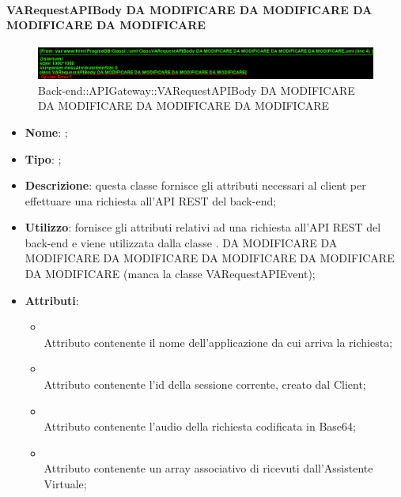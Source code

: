 \hypertarget{VARequestAPIBody DA MODIFICARE DA MODIFICARE DA MODIFICARE DA MODIFICARE_label}{\paragraph{VARequestAPIBody DA MODIFICARE DA MODIFICARE DA MODIFICARE DA MODIFICARE}}
\begin{figure}[h]
	\centering
	\includegraphics[width=\textwidth,height=\textheight,keepaspectratio]{images/ClassVARequestAPIBody DA MODIFICARE DA MODIFICARE DA MODIFICARE DA MODIFICARE.png}
	\caption{Back-end::APIGateway::VARequestAPIBody DA MODIFICARE DA MODIFICARE DA MODIFICARE DA MODIFICARE}
\end{figure}
\begin{itemize}
	\item \textbf{Nome}: ;
	\item \textbf{Tipo}: ;
	\item \textbf{Descrizione}: questa classe fornisce gli attributi necessari al client per effettuare una richiesta all'API REST del back-end;
	\item \textbf{Utilizzo}: fornisce gli attributi relativi ad una richiesta all'API REST del back-end e viene utilizzata dalla classe . DA MODIFICARE DA MODIFICARE DA MODIFICARE DA MODIFICARE DA MODIFICARE DA MODIFICARE (manca la classe VARequestAPIEvent);
	\item \textbf{Attributi}:
	\begin{itemize}
		\item[]  \\
		Attributo contenente il nome dell'applicazione da cui arriva la richiesta;
		\item[]  \\
		Attributo contenente l'id della sessione corrente, creato dal Client;
		\item[]  \\
		Attributo contenente l'audio della richiesta codificata in Base64;
		\item[]  \\
		Attributo contenente un array associativo di  ricevuti dall'Assistente Virtuale;
	\end{itemize}
\end{itemize}
\FloatBarrier

